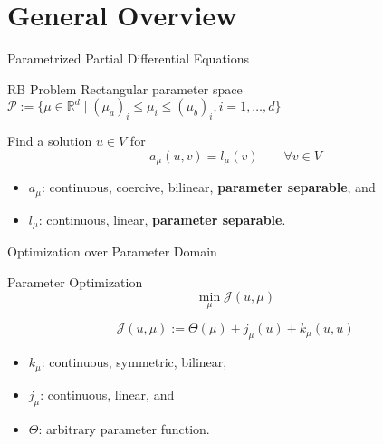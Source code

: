 \section{General Overview}

\begin{frame}{Parametrized Partial Differential Equations}
    \begin{block}{RB Problem}
        Rectangular parameter space $\mathcal{P} := \{ \mu \in \mathbb{R}^d \; | \; {(\mu_a)}_i \leq \mu_i \leq {(\mu_b)}_i, i = 1, \dots, d \}$

        Find a solution $u \in V$ for
        \begin{equation*}
            a_\mu(u, v) = l_\mu(v) \qquad \forall v \in V
        \end{equation*}
    \end{block}
    \begin{itemize}
        \item $a_\mu$: continuous, coercive, bilinear, \textbf{parameter separable}, and
        \item $l_\mu$: continuous, linear, \textbf{parameter separable}.   
    \end{itemize}
\end{frame}

\begin{frame}{Optimization over Parameter Domain}
    \begin{block}{Parameter Optimization}
        \vspace*{-8pt}
        \[ \min\limits_{\mu} \mathcal{J}(u, \mu) \]
    \end{block}
    \[ \mathcal{J}(u, \mu) := \Theta(\mu) + j_\mu(u) + k_\mu(u, u) \]
    \begin{itemize}
        \item $k_\mu$: continuous, symmetric, bilinear,
        \item $j_\mu$: continuous, linear, and
        \item $\Theta$: arbitrary parameter function.
    \end{itemize}
\end{frame}

